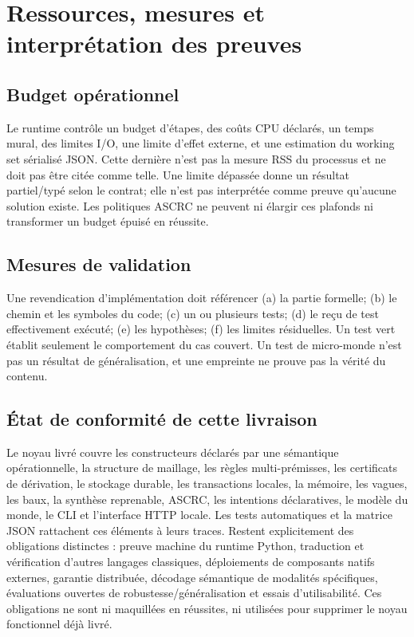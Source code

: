 \documentclass[11pt,a4paper,openany]{book}
\theoremstyle{definition}
\theoremstyle{plain}
\theoremstyle{remark}
\begin{document}
\chapter{Ressources, mesures et interprétation des preuves}
\section{Budget opérationnel}
Le runtime contrôle un budget d'étapes, des coûts CPU déclarés, un temps mural, des limites I/O, une limite d'effet externe, et une estimation du working set sérialisé JSON. Cette dernière n'est pas la mesure RSS du processus et ne doit pas être citée comme telle. Une limite dépassée donne un résultat partiel/typé selon le contrat; elle n'est pas interprétée comme preuve qu'aucune solution existe. Les politiques ASCRC ne peuvent ni élargir ces plafonds ni transformer un budget épuisé en réussite.

\section{Mesures de validation}
Une revendication d'implémentation doit référencer (a) la partie formelle; (b) le chemin et les symboles du code; (c) un ou plusieurs tests; (d) le reçu de test effectivement exécuté; (e) les hypothèses; (f) les limites résiduelles. Un test vert établit seulement le comportement du cas couvert. Un test de micro-monde n'est pas un résultat de généralisation, et une empreinte ne prouve pas la vérité du contenu.

\section{État de conformité de cette livraison}
Le noyau livré couvre les constructeurs déclarés par une sémantique opérationnelle, la structure de maillage, les règles multi-prémisses, les certificats de dérivation, le stockage durable, les transactions locales, la mémoire, les vagues, les baux, la synthèse reprenable, ASCRC, les intentions déclaratives, le modèle du monde, le CLI et l'interface HTTP locale. Les tests automatiques et la matrice JSON rattachent ces éléments à leurs traces. Restent explicitement des obligations distinctes : preuve machine du runtime Python, traduction et vérification d'autres langages classiques, déploiements de composants natifs externes, garantie distribuée, décodage sémantique de modalités spécifiques, évaluations ouvertes de robustesse/généralisation et essais d'utilisabilité. Ces obligations ne sont ni maquillées en réussites, ni utilisées pour supprimer le noyau fonctionnel déjà livré.
\end{document}
